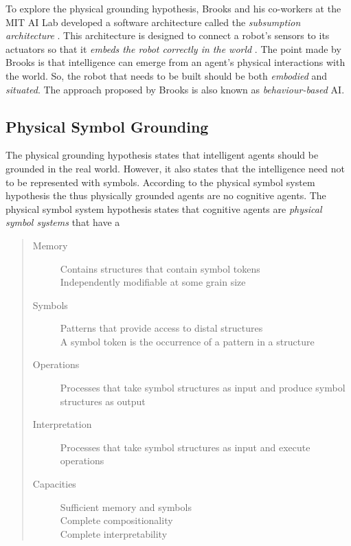 To explore the physical grounding hypothesis, Brooks and his co-workers at the MIT AI Lab developed a software architecture called the {\em subsumption architecture} \citep{brooks:1986}. This architecture is designed to connect a robot's sensors to its actuators so that it {\em embeds the robot correctly in the world} \citep{brooks:1990}.  The point made by Brooks is that intelligence can emerge from an agent's physical interactions with the world. So, the robot that needs to be built should be both {\em embodied} and {\em situated}. The approach proposed by Brooks is also known as {\em behaviour-based} AI.


\subsection{Physical Symbol Grounding}

The physical grounding hypothesis \citep{brooks:1990} states that intelligent agents should be grounded in the real world. However, it also states that the intelligence need not to be represented with symbols. According to the physical symbol system hypothesis the thus physically grounded agents are no cognitive agents. The physical symbol system hypothesis \citep{newell:1980} states that cognitive agents are {\em physical symbol systems} that have a \cite[p. 77]{newell:1990}

\begin{quote}
\begin{description}
\item[Memory]
Contains structures that contain symbol tokens\\
Independently modifiable at some grain size

\item[Symbols]
Patterns that provide access to distal structures\\
A symbol token is the occurrence of a pattern in a structure

\item[Operations]
Processes that take symbol structures as input and produce symbol structures as output

\item[Interpretation]
Processes that take symbol structures as input and execute operations

\item[Capacities]
Sufficient memory and symbols\\
Complete compositionality\\
Complete interpretability
\end{description}
\end{quote}



